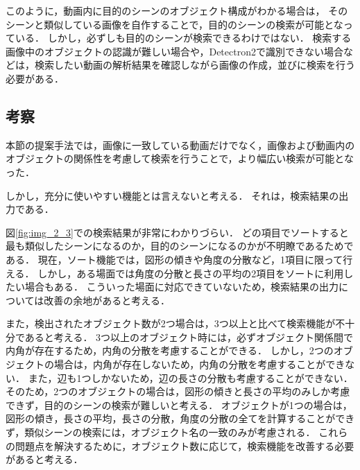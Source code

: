 \documentclass[a4j,12pt,dvipdfmx]{jreport}
\begin{document}
このように，動画内に目的のシーンのオブジェクト構成がわかる場合は，
そのシーンと類似している画像を自作することで，目的のシーンの検索が可能となっている．
しかし，必ずしも目的のシーンが検索できるわけではない．
検索する画像中のオブジェクトの認識が難しい場合や，Detectron2で識別できない場合などは，検索したい動画の解析結果を確認しながら画像の作成，並びに検索を行う必要がある．

\subsection{考察}\label{chap4-3-1}
本節の提案手法では，画像に一致している動画だけでなく，画像および動画内のオブジェクトの関係性を考慮して検索を行うことで，より幅広い検索が可能となった．

しかし，充分に使いやすい機能とは言えないと考える．
それは，検索結果の出力である．

図\ref{fig:img_2_3}での検索結果が非常にわかりづらい．
どの項目でソートすると最も類似したシーンになるのか，目的のシーンになるのかが不明瞭であるためである．
現在，ソート機能では，図形の傾きや角度の分散など，1項目に限って行える．
しかし，ある場面では角度の分散と長さの平均の2項目をソートに利用したい場合もある．
こういった場面に対応できていないため，検索結果の出力については改善の余地があると考える．

また，検出されたオブジェクト数が2つ場合は，3つ以上と比べて検索機能が不十分であると考える．
3つ以上のオブジェクト時には，必ずオブジェクト関係間で内角が存在するため，内角の分散を考慮することができる．
しかし，2つのオブジェクトの場合は，内角が存在しないため，内角の分散を考慮することができない．
また，辺も1つしかないため，辺の長さの分散も考慮することができない．
そのため，2つのオブジェクトの場合は，図形の傾きと長さの平均のみしか考慮できず，目的のシーンの検索が難しいと考える．
オブジェクトが1つの場合は，図形の傾き，長さの平均，長さの分散，角度の分散の全てを計算することができず，類似シーンの検索には，オブジェクト名の一致のみが考慮される．
これらの問題点を解決するために，オブジェクト数に応じて，検索機能を改善する必要があると考える．
\end{document}
